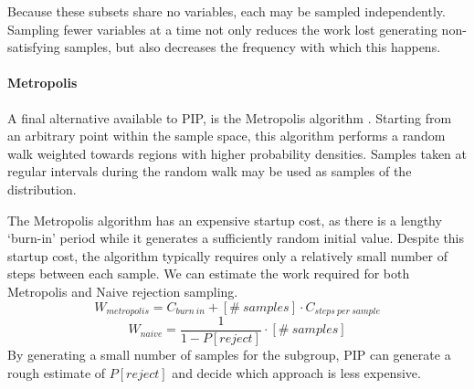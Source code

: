 Because these subsets share no variables, each may be sampled independently.  Sampling fewer variables at a time not only reduces the work lost generating non-satisfying samples, but also decreases the frequency with which this happens.




\paragraph{Metropolis}
A final alternative available to PIP, is the Metropolis  algorithm \cite{metropolis}.   Starting from  an arbitrary point within the sample space,  this algorithm performs a random walk weighted towards  regions with higher  probability  densities.  Samples  taken  at regular  intervals during the random walk may be used as samples of the distribution.

The Metropolis algorithm has an  expensive startup cost, as there is a
lengthy  `burn-in' period  while  it generates  a sufficiently  random
initial  value.  Despite  this startup  cost, the  algorithm typically
requires only a relatively small  number of steps between each sample.
We can estimate the work required for both Metropolis and Naive rejection sampling.
$$W_{metropolis} = C_{burn\ in} + [\#\ samples] \cdot C_{steps\ per\ sample}$$
$$W_{naive} = \frac{1}{1-P[reject]} \cdot [\#\ samples]$$
By generating a small number of samples for the subgroup, PIP can generate a rough estimate of $P[reject]$ and decide which approach is less expensive.



